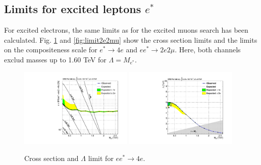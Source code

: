 \subsection{Limits for excited leptons $e^{*}$}

For excited electrons, the same limits as for the excited muons search has been calculated. Fig. \ref{fig:limit4e} and \ref{fig:limit2e2mu} show the cross section limits and the limits on the compositeness scale for $e^{*}\rightarrow 4e$ and $ee^{*} \rightarrow 2e2\mu$. Here, both channels exclud masses up to 1.60 TeV for $\Lambda = M_{e^{*}}$. 

\begin{figure}[hp!]
\begin{center}
\includegraphics[width=0.48\textwidth]{plot/limit_4e.pdf}
\includegraphics[width=0.48\textwidth]{plot/limit_lambda_2e2mu.pdf}
\end{center}
\caption{\label{fig:limit4e}Cross section and $\Lambda$ limit for $e e^{*} \rightarrow 4e$.}
\end{figure}

